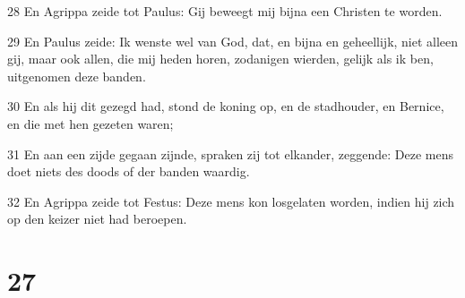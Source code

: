 \par 28 En Agrippa zeide tot Paulus: Gij beweegt mij bijna een Christen te worden.
\par 29 En Paulus zeide: Ik wenste wel van God, dat, en bijna en geheellijk, niet alleen gij, maar ook allen, die mij heden horen, zodanigen wierden, gelijk als ik ben, uitgenomen deze banden.
\par 30 En als hij dit gezegd had, stond de koning op, en de stadhouder, en Bernice, en die met hen gezeten waren;
\par 31 En aan een zijde gegaan zijnde, spraken zij tot elkander, zeggende: Deze mens doet niets des doods of der banden waardig.
\par 32 En Agrippa zeide tot Festus: Deze mens kon losgelaten worden, indien hij zich op den keizer niet had beroepen.

\chapter{27}

